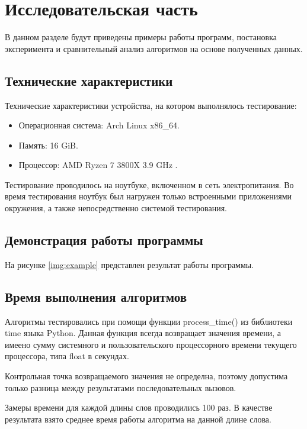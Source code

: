 \chapter{Исследовательская часть}

В данном разделе будут приведены примеры работы программ, постановка эксперимента и сравнительный анализ алгоритмов на основе полученных данных.

\section{Технические характеристики}

Технические характеристики устройства, на котором выполнялось тестирование:

\begin{itemize}
	\item Операционная система: Arch \cite{ubuntu} Linux \cite{linux} x86\_64.
	\item Память: 16 GiB.
	\item Процессор: AMD Ryzen 7 3800X 3.9 GHz \cite{intel}.
\end{itemize}

Тестирование проводилось на ноутбуке, включенном в сеть электропитания. Во время тестирования ноутбук был нагружен только встроенными приложениями окружения, а также непосредственно системой тестирования.

\section{Демонстрация работы программы}


На рисунке \ref{img:example} представлен результат работы программы.


\section{Время выполнения алгоритмов}

Алгоритмы тестировались при помощи функции process\_time() из библиотеки time языка Python. Данная функция всегда возвращает значения времени, а имеено сумму системного и пользовательского процессорного времени текущего процессора, типа float в секундах.

Контрольная точка возвращаемого значения не определна, поэтому допустима только разница между результатами последовательных вызовов.

Замеры времени для каждой длины слов проводились 100 раз. В качестве результата взято среднее время работы алгоритма на данной длине слова.

